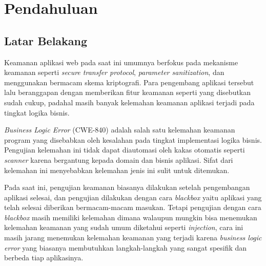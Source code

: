 \chapter{Pendahuluan}

\section{Latar Belakang}

Keamanan aplikasi web pada saat ini umumnya berfokus pada mekanisme keamanan
seperti \emph{secure transfer protocol}, \emph{parameter sanitization}, dan menggunakan bermacam skema
kriptografi. Para pengembang aplikasi tersebut lalu beranggapan dengan memberikan fitur keamanan seperti yang
disebutkan sudah cukup, padahal masih banyak kelemahan keamanan aplikasi terjadi pada
tingkat logika bisnis.

\emph{Business Logic Error} (CWE-840) adalah salah satu kelemahan
keamanan program yang disebabkan oleh kesalahan pada
tingkat implementasi logika bisnis.
Pengujian kelemahan ini tidak dapat diautomasi oleh kakas otomatis seperti \emph{scanner}
karena bergantung kepada domain dan bisnis aplikasi.
Sifat dari kelemahan ini menyebabkan kelemahan jenis ini sulit untuk ditemukan.

Pada saat ini, pengujian keamanan biasanya dilakukan setelah pengembangan aplikasi selesai, dan pengujian
dilakukan dengan cara \emph{blackbox} yaitu aplikasi yang telah selesai diberikan bermacam-macam masukan.
Tetapi pengujian dengan cara \emph{blackbox} masih memiliki kelemahan dimana walaupun mungkin bisa menemukan
kelemahan keamanan yang sudah umum diketahui seperti \emph{injection}, cara ini masih jarang menemukan
kelemahan keamanan yang terjadi karena \emph{business logic error} yang biasanya membutuhkan
langkah-langkah yang sangat spesifik dan berbeda tiap aplikasinya.


